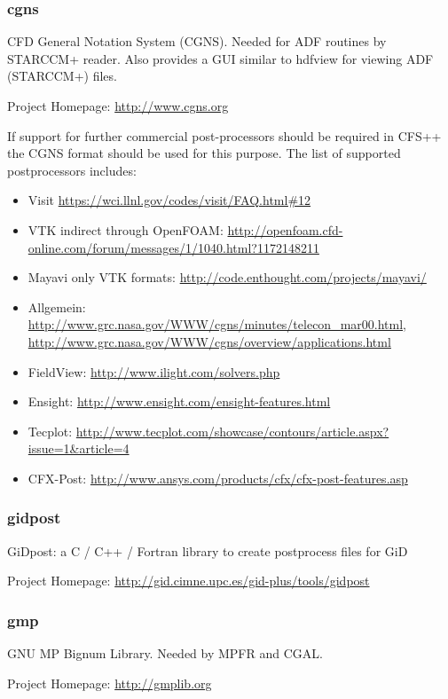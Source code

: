 \subsubsection{cgns}  CFD  General  Notation  System (CGNS).  Needed  for  ADF
routines  by STARCCM+  reader.  Also provides  a  GUI similar  to hdfview  for
viewing ADF (STARCCM+) files.

\noindent Project Homepage: \url{http://www.cgns.org}

If support for further commercial  post-processors should be required in CFS++
the  CGNS format  should  be used  for  this purpose.  The  list of  supported
postprocessors includes:

\begin{itemize}
\item Visit \url{https://wci.llnl.gov/codes/visit/FAQ.html#12}
\item VTK indirect through OpenFOAM: \url{http://openfoam.cfd-online.com/forum/messages/1/1040.html?1172148211}
\item Mayavi only VTK formats: \url{http://code.enthought.com/projects/mayavi/}
\item Allgemein: \url{http://www.grc.nasa.gov/WWW/cgns/minutes/telecon_mar00.html},
\url{http://www.grc.nasa.gov/WWW/cgns/overview/applications.html}
\item FieldView: \url{http://www.ilight.com/solvers.php}
\item Ensight: \url{http://www.ensight.com/ensight-features.html}
\item Tecplot: \url{http://www.tecplot.com/showcase/contours/article.aspx?issue=1&article=4}
\item CFX-Post: \url{http://www.ansys.com/products/cfx/cfx-post-features.asp}
\end{itemize}


\subsubsection{gidpost}  GiDpost:  a C  /  C++  /  Fortran library  to  create
postprocess files for GiD

\noindent Project Homepage: \url{http://gid.cimne.upc.es/gid-plus/tools/gidpost}
 
\subsubsection{gmp} GNU MP Bignum Library. Needed by MPFR and CGAL.

\noindent Project Homepage: \url{http://gmplib.org}

